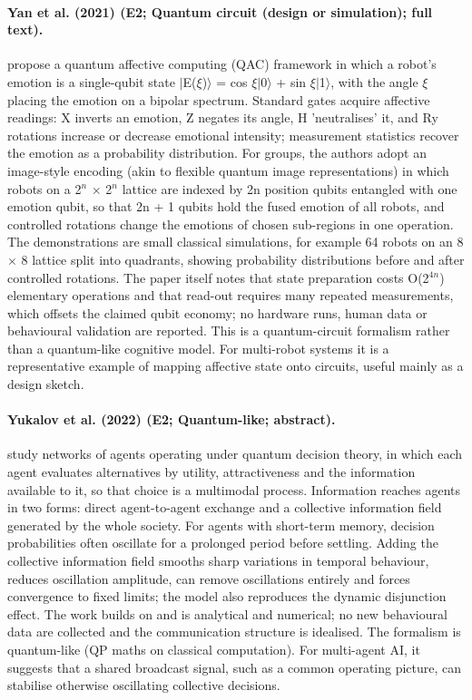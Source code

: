\documentclass[10pt,a4paper]{article}
\begin{document}
\paragraph{Yan et al. (2021) (E2; Quantum circuit (design or simulation); full text).} \citet{Yan2021a} propose a quantum affective computing (QAC) framework in which a robot's emotion is a single-qubit state $|$E($\xi$)$\rangle$ = cos $\xi |$0$\rangle$ + sin $\xi |$1$\rangle$, with the angle $\xi$ placing the emotion on a bipolar spectrum. Standard gates acquire affective readings: X inverts an emotion, Z negates its angle, H 'neutralises' it, and Ry rotations increase or decrease emotional intensity; measurement statistics recover the emotion as a probability distribution. For groups, the authors adopt an image-style encoding (akin to flexible quantum image representations) in which robots on a 2$^n$ $\times$ 2$^n$ lattice are indexed by 2n position qubits entangled with one emotion qubit, so that 2n + 1 qubits hold the fused emotion of all robots, and controlled rotations change the emotions of chosen sub-regions in one operation. The demonstrations are small classical simulations, for example 64 robots on an 8 $\times$ 8 lattice split into quadrants, showing probability distributions before and after controlled rotations. The paper itself notes that state preparation costs O(2$^{4n}$) elementary operations and that read-out requires many repeated measurements, which offsets the claimed qubit economy; no hardware runs, human data or behavioural validation are reported. This is a quantum-circuit formalism rather than a quantum-like cognitive model. For multi-robot systems it is a representative example of mapping affective state onto circuits, useful mainly as a design sketch.

\paragraph{Yukalov et al. (2022) (E2; Quantum-like; abstract).} \citet{Yukalov2022} study networks of agents operating under quantum decision theory, in which each agent evaluates alternatives by utility, attractiveness and the information available to it, so that choice is a multimodal process. Information reaches agents in two forms: direct agent-to-agent exchange and a collective information field generated by the whole society. For agents with short-term memory, decision probabilities often oscillate for a prolonged period before settling. Adding the collective information field smooths sharp variations in temporal behaviour, reduces oscillation amplitude, can remove oscillations entirely and forces convergence to fixed limits; the model also reproduces the dynamic disjunction effect. The work builds on \citep{Yukalov2018} and is analytical and numerical; no new behavioural data are collected and the communication structure is idealised. The formalism is quantum-like (QP maths on classical computation). For multi-agent AI, it suggests that a shared broadcast signal, such as a common operating picture, can stabilise otherwise oscillating collective decisions.
\end{document}
